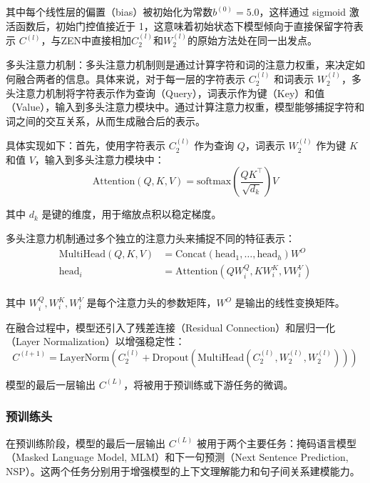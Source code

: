 \documentclass[12pt, a4paper]{ctexart}
\begin{document}
其中每个线性层的偏置（bias）被初始化为常数$b^{(0)} = 5.0$，这样通过 sigmoid 激活函数后，初始门控值接近于 1，这意味着初始状态下模型倾向于直接保留字符表示 $C^{(l)}$，与ZEN中直接相加$C^{(l)}_2$和$W^{(l)}_2$的原始方法处在同一出发点。

\vspace{2em} %

多头注意力机制：多头注意力机制则是通过计算字符和词的注意力权重，来决定如何融合两者的信息。具体来说，对于每一层的字符表示 $C^{(l)}_2$ 和词表示 $W^{(l)}_2$，多头注意力机制将字符表示作为查询（Query），词表示作为键（Key）和值（Value），输入到多头注意力模块中。通过计算注意力权重，模型能够捕捉字符和词之间的交互关系，从而生成融合后的表示。

具体实现如下：首先，使用字符表示 $C^{(l)}_2$ 作为查询 $Q$，词表示 $W^{(l)}_2$ 作为键 $K$ 和值 $V$，输入到多头注意力模块中：
\begin{equation}
    \text{Attention}(Q, K, V) = \text{softmax}\left(\frac{QK^\top}{\sqrt{d_k}}\right)V
\end{equation}

其中 $d_k$ 是键的维度，用于缩放点积以稳定梯度。

多头注意力机制通过多个独立的注意力头来捕捉不同的特征表示：
\begin{equation}
    \begin{split}
        \text{MultiHead}(Q, K, V) &= \text{Concat}(\text{head}_1, \dots, \text{head}_h)W^O \\
        \text{head}_i &= \text{Attention}(QW_i^Q, KW_i^K, VW_i^V) \\
    \end{split}
\end{equation}

其中 $W_i^Q, W_i^K, W_i^V$ 是每个注意力头的参数矩阵，$W^O$ 是输出的线性变换矩阵。

在融合过程中，模型还引入了残差连接（Residual Connection）和层归一化（Layer Normalization）以增强稳定性：
\begin{equation}
    C^{(l+1)} = \text{LayerNorm}(C^{(l)}_2 + \text{Dropout}(\text{MultiHead}(C^{(l)}_2, W^{(l)}_2, W^{(l)}_2)))
\end{equation}

模型的最后一层输出 $C^{(L)}$，将被用于预训练或下游任务的微调。

\subsubsection{预训练头}
在预训练阶段，模型的最后一层输出 $C^{(L)}$ 被用于两个主要任务：掩码语言模型（Masked Language Model, MLM）和下一句预测（Next Sentence Prediction, NSP）。这两个任务分别用于增强模型的上下文理解能力和句子间关系建模能力。
\end{document}
